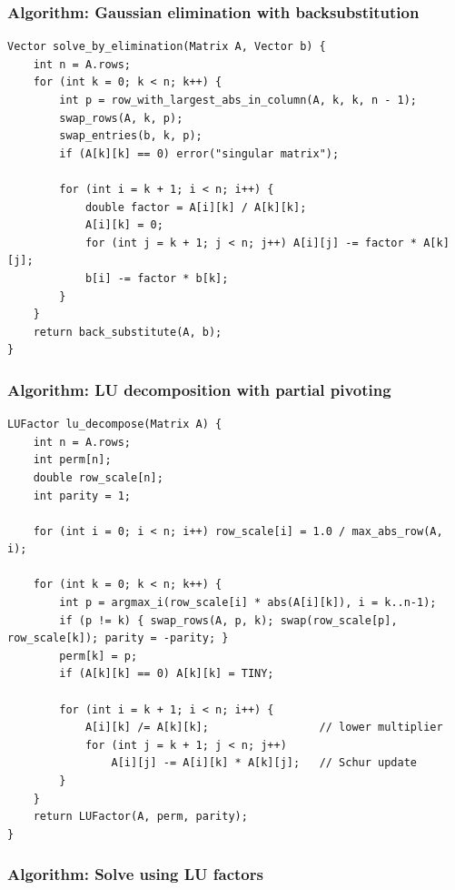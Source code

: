 \documentclass[11pt]{article}
\begin{document}
\subsubsection{Algorithm: Gaussian elimination with backsubstitution}\label{algorithm-gaussian-elimination-with-backsubstitution}

\begin{verbatim}
Vector solve_by_elimination(Matrix A, Vector b) {
    int n = A.rows;
    for (int k = 0; k < n; k++) {
        int p = row_with_largest_abs_in_column(A, k, k, n - 1);
        swap_rows(A, k, p);
        swap_entries(b, k, p);
        if (A[k][k] == 0) error("singular matrix");

        for (int i = k + 1; i < n; i++) {
            double factor = A[i][k] / A[k][k];
            A[i][k] = 0;
            for (int j = k + 1; j < n; j++) A[i][j] -= factor * A[k][j];
            b[i] -= factor * b[k];
        }
    }
    return back_substitute(A, b);
}
\end{verbatim}

\subsubsection{Algorithm: LU decomposition with partial pivoting}\label{algorithm-lu-decomposition-with-partial-pivoting}

\begin{verbatim}
LUFactor lu_decompose(Matrix A) {
    int n = A.rows;
    int perm[n];
    double row_scale[n];
    int parity = 1;

    for (int i = 0; i < n; i++) row_scale[i] = 1.0 / max_abs_row(A, i);

    for (int k = 0; k < n; k++) {
        int p = argmax_i(row_scale[i] * abs(A[i][k]), i = k..n-1);
        if (p != k) { swap_rows(A, p, k); swap(row_scale[p], row_scale[k]); parity = -parity; }
        perm[k] = p;
        if (A[k][k] == 0) A[k][k] = TINY;

        for (int i = k + 1; i < n; i++) {
            A[i][k] /= A[k][k];                 // lower multiplier
            for (int j = k + 1; j < n; j++)
                A[i][j] -= A[i][k] * A[k][j];   // Schur update
        }
    }
    return LUFactor(A, perm, parity);
}
\end{verbatim}

\subsubsection{Algorithm: Solve using LU factors}\label{algorithm-solve-using-lu-factors}
\end{document}
